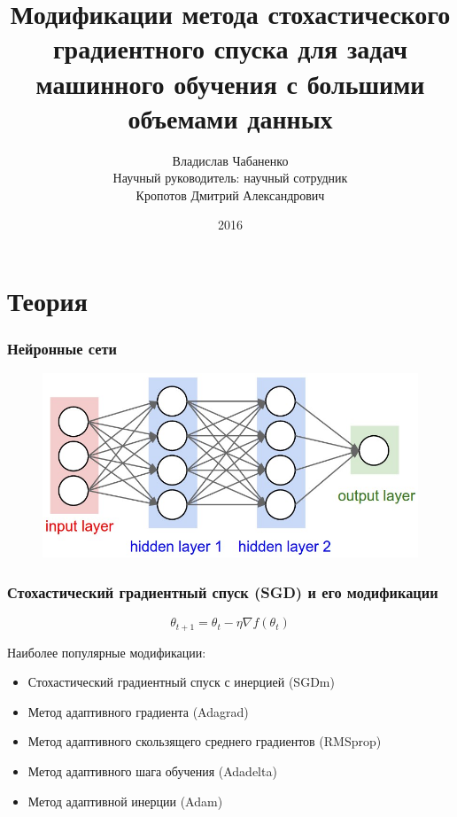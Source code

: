 \documentclass{beamer}
\title{Модификации метода стохастического градиентного спуска для задач машинного обучения с большими объемами данных}
\author[Chabanenko]{Владислав Чабаненко\\[5mm]Научный руководитель: научный сотрудник \\Кропотов Дмитрий Александрович}
\institute[ВМК МГУ имени М.В. Ломоносова]
{
\medskip
}
\date{2016}
\begin{document}
\begin{frame}
	\titlepage
\end{frame}

\section{Теория}

\begin{frame}
	\frametitle{Нейронные сети}
\begin{figure}
\centering
\includegraphics[scale=0.35]{mlp.jpeg}
\end{figure}
\end{frame}

	
	

\begin{frame}
\frametitle{Стохастический градиентный спуск (SGD) и его модификации}	

\begin{equation}
\theta_{t+1} = \theta_t - \eta \nabla f(\theta_t)
\end{equation}

Наиболее популярные модификации:

\begin{itemize}
\item Стохастический градиентный спуск с инерцией (SGDm) %
\item Метод адаптивного градиента (Adagrad) %
\item Метод адаптивного скользящего среднего градиентов (RMSprop) %
\item Метод адаптивного шага обучения (Adadelta) %
\item Метод адаптивной инерции (Adam) %
\end{itemize}

\end{frame}
\end{document}
